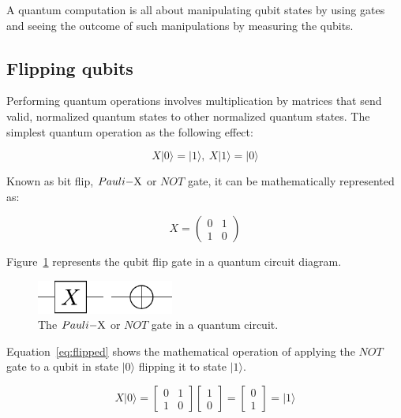 A quantum computation is all about manipulating qubit states by using gates and
seeing the outcome of such manipulations by measuring the qubits.

\subsection{Flipping qubits}
\label{sec:flip}

Performing quantum operations involves multiplication by matrices that send 
valid, normalized quantum states to other normalized quantum states. The 
simplest quantum operation as the following effect:

\begin{linenomath}
\begin{equation}
	X\vert 0 \rangle = \vert 1 \rangle, \
	X\vert 1 \rangle = \vert 0 \rangle
\label{eq:flip}
\end{equation}
\end{linenomath}

Known as bit flip, $Pauli\rm{-}X$ or $NOT$ gate, it can be mathematically represented as:

\begin{linenomath}
\begin{equation}
	X = \begin{pmatrix}
	0 & 1 \\
	1 & 0
	\end{pmatrix}
\label{eq:flipX}
\end{equation}
\end{linenomath}

Figure~\ref{fig:circuitX} represents the qubit flip gate in a quantum circuit 
diagram.

\begin{figure}[!htbp]
\centering
	\includegraphics[width=0.40\textwidth]{figures/X.pdf}
\caption{The $Pauli\rm{-}X$ or $NOT$ gate in a quantum circuit.}
\label{fig:circuitX}
\end{figure}

Equation~\ref{eq:flipped} shows the mathematical operation of applying the $NOT$
gate to a qubit in state $\vert 0 \rangle$ flipping it to state $\vert 1 \rangle$.

\begin{linenomath}
\begin{equation}
	X\vert 0 \rangle=\begin{bmatrix} 0 & 1 \\ 1 & 0 \end{bmatrix} \begin{bmatrix} 1 \\ 0 \end{bmatrix} = \begin{bmatrix} 0 \\ 1 \end{bmatrix} = \vert 1 \rangle
\label{eq:flipped}
\end{equation}
\end{linenomath}

